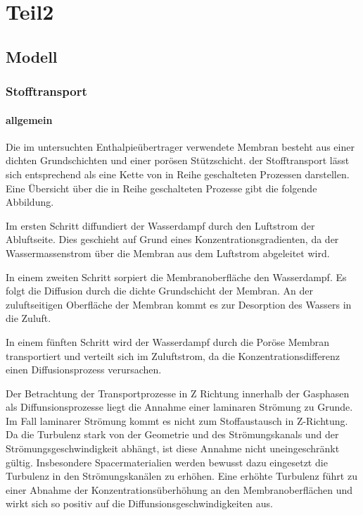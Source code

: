 \chapter{Teil2}
\label{cha:Teil2}
\section{Modell}
\label{sec:Modell}



\begin{normalsize}
\begin{LARGE}

\subsection{Stofftransport}

\subsubsection{allgemein}

Die im untersuchten Enthalpieübertrager verwendete Membran besteht aus einer dichten Grundschichten und einer porösen Stützschicht. der Stofftransport lässt sich entsprechend als eine Kette von in Reihe geschalteten Prozessen darstellen. Eine Übersicht über die in Reihe geschalteten Prozesse gibt die folgende Abbildung.

Im ersten Schritt diffundiert der Wasserdampf durch den Luftstrom der Abluftseite. Dies geschieht auf Grund eines Konzentrationsgradienten, da der Wassermassenstrom über die Membran aus dem Luftstrom abgeleitet wird. 

In einem zweiten Schritt sorpiert die Membranoberfläche den Wasserdampf. Es folgt die Diffusion durch die dichte Grundschicht der Membran. An der zuluftseitigen Oberfläche der Membran kommt es zur Desorption des Wassers in die Zuluft. 

In einem fünften Schritt wird der Wasserdampf durch die Poröse Membran transportiert und verteilt sich im Zuluftstrom, da die Konzentrationsdifferenz einen Diffusionsprozess verursachen.

Der Betrachtung der Transportprozesse in Z Richtung innerhalb der Gasphasen als Diffunsionsprozesse liegt die Annahme einer laminaren Strömung zu Grunde. Im Fall laminarer Strömung kommt es nicht zum Stoffaustausch in Z-Richtung. Da die Turbulenz stark von der Geometrie und des Strömungskanals und der Strömungsgeschwindigkeit abhängt, ist diese Annahme nicht uneingeschränkt gültig. Insbesondere Spacermaterialien werden bewusst dazu eingesetzt die Turbulenz in den Strömungskanälen zu erhöhen.
Eine erhöhte Turbulenz führt zu einer Abnahme der Konzentrationsüberhöhung an den Membranoberflächen und wirkt sich so positiv auf die Diffunsionsgeschwindigkeiten aus.  


\end{LARGE}
\end{normalsize}
